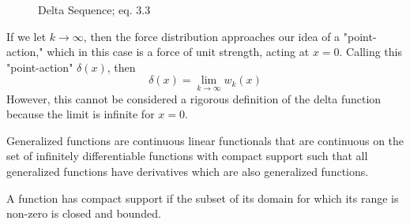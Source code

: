 \begin{figure}
    \centering
    \caption{Delta Sequence;  eq. 3.3}
\end{figure}

If we let \(k \rightarrow \infty\), then the force distribution approaches our idea of a "point-action," which in this case is a force of unit strength, acting at \(x=0\). Calling this "point-action" \(\delta(x)\), then
\begin{equation}
    \delta(x) = \lim_{k\rightarrow \infty} w_k(x)
\end{equation}
However, this cannot be considered a rigorous definition of the delta function because the limit is infinite for \(x=0\). 

\begin{definition}
    Generalized functions are continuous linear functionals that are continuous on the set of infinitely differentiable functions with compact support such that all generalized functions have derivatives which are also generalized functions.
\end{definition}

\begin{definition}
    A function has compact support if the subset of its domain for which its range is non-zero is closed and bounded.
\end{definition}

